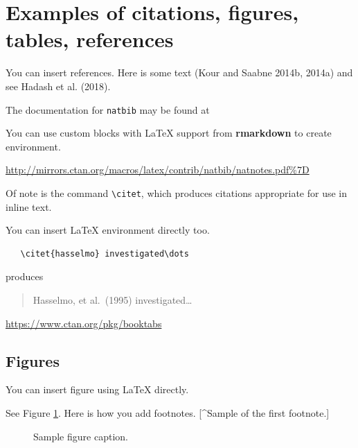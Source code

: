 \documentclass{article}
\begin{document}
\hypertarget{examples-of-citations-figures-tables-references}{%
\section{Examples of citations, figures, tables,
references}\label{examples-of-citations-figures-tables-references}}

\label{sec:others}

You can insert references. Here is some text (Kour and Saabne 2014b,
2014a) and see Hadash et al. (2018).

The documentation for \verb+natbib+ may be found at

You can use custom blocks with LaTeX support from \textbf{rmarkdown} to
create environment.

\begin{center}
\url{http://mirrors.ctan.org/macros/latex/contrib/natbib/natnotes.pdf\%7D}

\end{center}

Of note is the command \verb+\citet+, which produces citations
appropriate for use in inline text.

You can insert LaTeX environment directly too.

\begin{verbatim}
   \citet{hasselmo} investigated\dots
\end{verbatim}

produces

\begin{quote}
  Hasselmo, et al.\ (1995) investigated\dots
\end{quote}

\begin{center}
  \url{https://www.ctan.org/pkg/booktabs}
\end{center}

\hypertarget{figures}{%
\subsection{Figures}\label{figures}}

You can insert figure using LaTeX directly.

See Figure \ref{fig:fig1}. Here is how you add footnotes. {[}\^{}Sample
of the first footnote.{]}

\begin{figure}
  \centering
  \fbox{\rule[-.5cm]{4cm}{4cm} \rule[-.5cm]{4cm}{0cm}}
  \caption{Sample figure caption.}
  \label{fig:fig1}
\end{figure}
\end{document}
